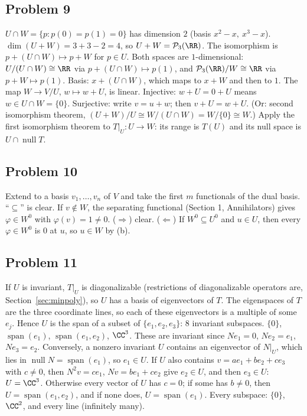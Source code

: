 \documentclass[10pt]{scrartcl}
\DeclareMathOperator{\nul}{null}
\DeclareMathOperator{\spn}{span}
\newcommand{\PP}{\mathcal P}
\begin{document}
\subsection*{Problem 9}
\begin{enumerate}[(a)]
  \ii $U\cap W=\{p:p(0)=p(1)=0\}$ has dimension $2$ (basis $x^2-x,\ x^3-x$). $\dim(U+W)=3+3-2=4$, so $U+W=\PP_3(\RR)$. The isomorphism is $p+(U\cap W)\mapsto p+W$ for $p\in U$. Both spaces are $1$-dimensional: $U/(U\cap W)\cong\RR$ via $p+(U\cap W)\mapsto p(1)$, and $\PP_3(\RR)/W\cong\RR$ via $p+W\mapsto p(1)$. Basis: $x+(U\cap W)$, which maps to $x+W$ and then to $1$.
  \ii The map $W\to V/U$, $w\mapsto w+U$, is linear. Injective: $w+U=0+U$ means $w\in U\cap W=\{0\}$. Surjective: write $v=u+w$; then $v+U=w+U$. (Or: second isomorphism theorem, $(U+W)/U\cong W/(U\cap W)=W/\{0\}\cong W$.)
  \ii Apply the first isomorphism theorem to $T|_U\colon U\to W$: its range is $T(U)$ and its null space is $U\cap\nul T$.
\end{enumerate}

\subsection*{Problem 10}
\begin{enumerate}[(a)]
  \ii Extend to a basis $v_1,\dots,v_n$ of $V$ and take the first $m$ functionals of the dual basis.
  \ii ``$\subseteq$'' is clear. If $v\notin W$, the separating functional (Section 1, Annihilators) gives $\varphi\in W^0$ with $\varphi(v)=1\ne0$.
  \ii ($\Rightarrow$) clear. ($\Leftarrow$) If $W^0\subseteq U^0$ and $u\in U$, then every $\varphi\in W^0$ is $0$ at $u$, so $u\in W$ by (b).
\end{enumerate}

\subsection*{Problem 11}
\begin{enumerate}[(a)]
  \ii If $U$ is invariant, $T|_U$ is diagonalizable (restrictions of diagonalizable operators are, Section~\ref{sec:minpoly}), so $U$ has a basis of eigenvectors of $T$. The eigenspaces of $T$ are the three coordinate lines, so each of these eigenvectors is a multiple of some $e_j$. Hence $U$ is the span of a subset of $\{e_1,e_2,e_3\}$: $8$ invariant subspaces.
  \ii $\{0\}$, $\spn(e_1)$, $\spn(e_1,e_2)$, $\CC^3$. These are invariant since $Ne_1=0$, $Ne_2=e_1$, $Ne_3=e_2$. Conversely, a nonzero invariant $U$ contains an eigenvector of $N|_U$, which lies in $\nul N=\spn(e_1)$, so $e_1\in U$. If $U$ also contains $v=ae_1+be_2+ce_3$ with $c\ne0$, then $N^2v=ce_1$, $Nv=be_1+ce_2$ give $e_2\in U$, and then $e_3\in U$: $U=\CC^3$. Otherwise every vector of $U$ has $c=0$; if some has $b\ne0$, then $U=\spn(e_1,e_2)$, and if none does, $U=\spn(e_1)$.
  \ii Every subspace: $\{0\}$, $\CC^2$, and every line (infinitely many).
\end{enumerate}
\end{document}
